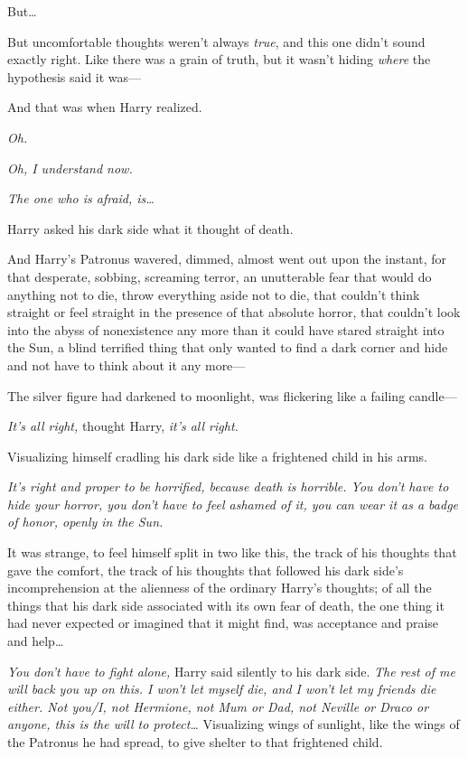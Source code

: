 But{\ldots}

But uncomfortable thoughts weren't always \emph{true}, and this one didn't 
sound exactly right. Like there was a grain of truth, but it wasn't hiding 
\emph{where} the hypothesis said it was---

And that was when Harry realized.

\emph{Oh.}

\emph{Oh, I understand now.}

\emph{The one who is afraid, is{\ldots}}

Harry asked his dark side what it thought of death.

And Harry's Patronus wavered, dimmed, almost went out upon the instant, for 
that desperate, sobbing, screaming terror, an unutterable fear that would do 
anything not to die, throw everything aside not to die, that couldn't think 
straight or feel straight in the presence of that absolute horror, that 
couldn't look into the abyss of nonexistence any more than it could have stared 
straight into the Sun, a blind terrified thing that only wanted to find a dark 
corner and hide and not have to think about it any more---

The silver figure had darkened to moonlight, was flickering like a failing 
candle---

\emph{It's all right,} thought Harry, \emph{it's all right.}

Visualizing himself cradling his dark side like a frightened child in his arms.

\emph{It's right and proper to be horrified, because death is horrible. You 
don't have to hide your horror, you don't have to feel ashamed of it, you can 
wear it as a badge of honor, openly in the Sun.}

It was strange, to feel himself split in two like this, the track of his 
thoughts that gave the comfort, the track of his thoughts that followed his 
dark side's incomprehension at the alienness of the ordinary Harry's thoughts; 
of all the things that his dark side associated with its own fear of death, the 
one thing it had never expected or imagined that it might find, was acceptance 
and praise and help{\ldots}

\emph{You don't have to fight alone,} Harry said silently to his dark side. 
\emph{The rest of me will back you up on this. I won't let myself die, and I 
won't let my friends die either. Not you/I, not Hermione, not Mum or Dad, not 
Neville or Draco or anyone, this is the will to protect{\ldots}} Visualizing 
wings of sunlight, like the wings of the Patronus he had spread, to give 
shelter to that frightened child.

